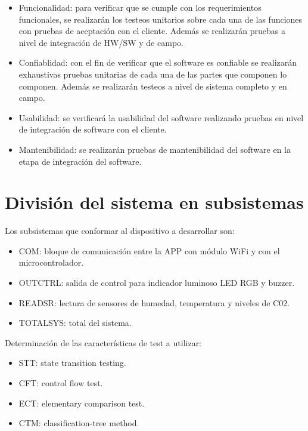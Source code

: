 \documentclass[11pt]{article}
\begin{document}
\begin{itemize}
    \item Funcionalidad: para verificar que se cumple con los requerimientos
          funcionales, se realizarán los testeos unitarios sobre cada una de las
          funciones con pruebas de aceptación con el cliente. Además se realizarán
          pruebas a nivel de integración de HW/SW y de campo.
    \item Confiablidad: con el fin de verificar que el software es confiable se
          realizarán exhaustivas pruebas unitarias de cada una de las partes que componen
          lo componen. Además se realizarán testeos a nivel de sistema completo y en
          campo.
    \item Usabilidad: se verificará la usabilidad del software realizando pruebas
          en nivel de integración de software con el cliente.
    \item Mantenibilidad: se realizarán pruebas de mantenibilidad del software en
          la etapa de integración del software.
\end{itemize}

\section{División del sistema en subsistemas}

Los subsistemas que conformar al dispositivo a desarrollar son:
\begin{itemize}
    \item COM: bloque de comunicación entre la APP con módulo WiFi y con el
          microcontrolador.
    \item OUTCTRL: salida de control para indicador luminoso LED RGB y buzzer.
    \item READSR: lectura de sensores de humedad, temperatura y niveles de C02.
    \item TOTALSYS: total del sistema.
\end{itemize}

Determinación de las características de test a utilizar:
\begin{itemize}
    \item STT: state transition testing.
    \item CFT: control flow test.
    \item ECT: elementary comparison test.
    \item CTM: classification-tree method.
\end{itemize}
\end{document}

